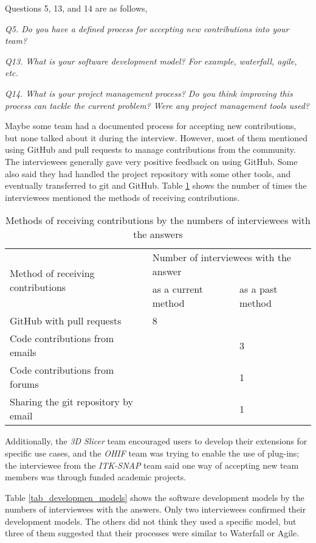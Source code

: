 Questions 5, 13, and 14 are as follows,


\textit{Q5. Do you have a defined process for accepting new contributions into your team?}

\textit{Q13. What is your software development model? For example, waterfall, agile, etc.}

\textit{Q14. What is your project management process? Do you think improving this process can tackle the current problem? Were any project management tools used?}

Maybe some team had a documented process for accepting new contributions, but none talked about it during the interview. However, most of them mentioned using GitHub and pull requests to manage contributions from the community. The interviewees generally gave very positive feedback on using GitHub. Some also said they had handled the project repository with some other tools, and eventually transferred to git and GitHub. Table \ref{tab_method_receive_contributions} shows the number of times the interviewees mentioned the methods of receiving contributions.

\begin{table}[H]
\centering
\begin{tabular}{lll}
\hline
\multirow{2}{*}{Method of receiving contributions} & \multicolumn{2}{l}{Number of interviewees with the answer} \\ \cline{2-3} 
 & as a current method & as a past method \\ \hline
GitHub with pull requests & 8 & \\
Code contributions from emails & & 3 \\
Code contributions from forums & & 1 \\
Sharing the git repository by email & & 1 \\ \hline
\end{tabular}
\caption{\label{tab_method_receive_contributions}Methods of receiving contributions by the numbers of interviewees with the answers}
\end{table}

Additionally, the \textit{3D Slicer} team encouraged users to develop their extensions for specific use cases, and the \textit{OHIF} team was trying to enable the use of plug-ins; the interviewee from the \textit{ITK-SNAP} team said one way of accepting new team members was through funded academic projects. 

Table \ref{tab_developmen_models} shows the software development models by the numbers of interviewees with the answers. Only two interviewees confirmed their development models. The others did not think they used a specific model, but three of them suggested that their processes were similar to Waterfall or 
Agile.


